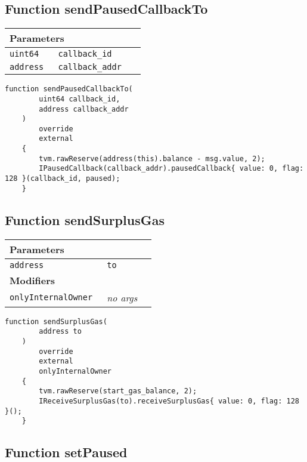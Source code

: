 \subsection{Function sendPausedCallbackTo}


\ifsoltables
\noindent\begin{tabular}{|l|l|p{5cm}|}\hline
\multicolumn{3}{|l|}{\bf Parameters}\\\hline
\tt uint64 & \tt callback\_{}id &\\\hline
\tt address & \tt callback\_{}addr &\\\hline
\end{tabular}
\fi

\vspace{2cm}

\begin{lstlisting}[firstnumber=423]
    function sendPausedCallbackTo(
        uint64 callback_id,
        address callback_addr
    )
        override
        external
    {
        tvm.rawReserve(address(this).balance - msg.value, 2);
        IPausedCallback(callback_addr).pausedCallback{ value: 0, flag: 128 }(callback_id, paused);
    }
\end{lstlisting}

\subsection{Function sendSurplusGas}


\ifsoltables
\noindent\begin{tabular}{|l|l|p{5cm}|}\hline
\multicolumn{3}{|l|}{\bf Parameters}\\\hline
\tt address & \tt to &\\\hline
\multicolumn{3}{|l|}{\bf Modifiers}\\\hline
\tt onlyInternalOwner & {\em no args} &\\\hline
\end{tabular}
\fi

\vspace{2cm}

\begin{lstlisting}[firstnumber=386]
    function sendSurplusGas(
        address to
    )
        override
        external
        onlyInternalOwner
    {
        tvm.rawReserve(start_gas_balance, 2);
        IReceiveSurplusGas(to).receiveSurplusGas{ value: 0, flag: 128 }();
    }
\end{lstlisting}

\subsection{Function setPaused}


